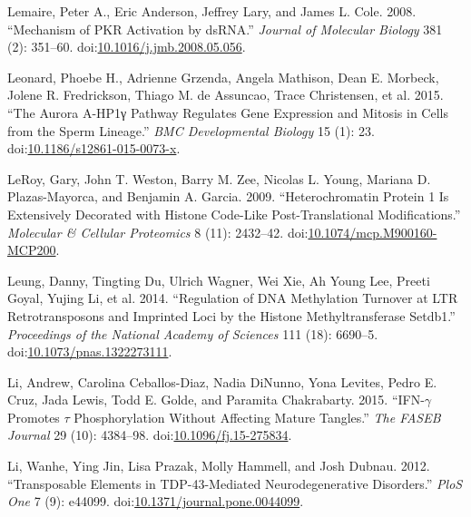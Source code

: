 \documentclass[onehalf,12pt]{beavtex}
\begin{document}
  \hypertarget{ref-LemaireMechanismPKRActivation2008}{}
  Lemaire, Peter A., Eric Anderson, Jeffrey Lary, and James L. Cole. 2008.
  ``Mechanism of PKR Activation by dsRNA.'' \emph{Journal of Molecular
  Biology} 381 (2): 351--60.
  doi:\href{https://doi.org/10.1016/j.jmb.2008.05.056}{10.1016/j.jmb.2008.05.056}.
  
  \hypertarget{ref-LeonardAuroraAHP1gpathway2015}{}
  Leonard, Phoebe H., Adrienne Grzenda, Angela Mathison, Dean E. Morbeck,
  Jolene R. Fredrickson, Thiago M. de Assuncao, Trace Christensen, et al.
  2015. ``The Aurora A-HP1γ Pathway Regulates Gene Expression and Mitosis
  in Cells from the Sperm Lineage.'' \emph{BMC Developmental Biology} 15
  (1): 23.
  doi:\href{https://doi.org/10.1186/s12861-015-0073-x}{10.1186/s12861-015-0073-x}.
  
  \hypertarget{ref-LeRoyHeterochromatinProteinExtensively2009}{}
  LeRoy, Gary, John T. Weston, Barry M. Zee, Nicolas L. Young, Mariana D.
  Plazas-Mayorca, and Benjamin A. Garcia. 2009. ``Heterochromatin Protein
  1 Is Extensively Decorated with Histone Code-Like Post-Translational
  Modifications.'' \emph{Molecular \& Cellular Proteomics} 8 (11):
  2432--42.
  doi:\href{https://doi.org/10.1074/mcp.M900160-MCP200}{10.1074/mcp.M900160-MCP200}.
  
  \hypertarget{ref-LeungRegulationDNAmethylation2014a}{}
  Leung, Danny, Tingting Du, Ulrich Wagner, Wei Xie, Ah Young Lee, Preeti
  Goyal, Yujing Li, et al. 2014. ``Regulation of DNA Methylation Turnover
  at LTR Retrotransposons and Imprinted Loci by the Histone
  Methyltransferase Setdb1.'' \emph{Proceedings of the National Academy of
  Sciences} 111 (18): 6690--5.
  doi:\href{https://doi.org/10.1073/pnas.1322273111}{10.1073/pnas.1322273111}.
  
  \hypertarget{ref-LiIFNgpromotesphosphorylation2015}{}
  Li, Andrew, Carolina Ceballos-Diaz, Nadia DiNunno, Yona Levites, Pedro
  E. Cruz, Jada Lewis, Todd E. Golde, and Paramita Chakrabarty. 2015.
  ``IFN-\(\gamma\) Promotes \(\tau\) Phosphorylation Without Affecting
  Mature Tangles.'' \emph{The FASEB Journal} 29 (10): 4384--98.
  doi:\href{https://doi.org/10.1096/fj.15-275834}{10.1096/fj.15-275834}.
  
  \hypertarget{ref-LiTransposableelementsTDP43mediated2012}{}
  Li, Wanhe, Ying Jin, Lisa Prazak, Molly Hammell, and Josh Dubnau. 2012.
  ``Transposable Elements in TDP-43-Mediated Neurodegenerative
  Disorders.'' \emph{PloS One} 7 (9): e44099.
  doi:\href{https://doi.org/10.1371/journal.pone.0044099}{10.1371/journal.pone.0044099}.
  
\end{document}
